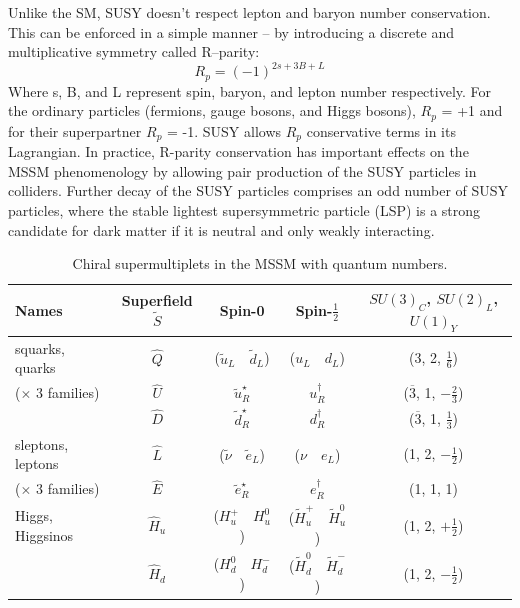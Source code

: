 Unlike the SM, SUSY doesn’t respect lepton and baryon number conservation. This can be enforced in a simple manner – by introducing a discrete and multiplicative symmetry called R–parity: 
\begin{equation}\label{equ:rparity}
R_{p} = (-1)^{2s+3B+L}
\end{equation}
Where s, B, and L represent spin, baryon, and lepton number respectively. For the ordinary particles (fermions, gauge bosons, and Higgs bosons), $R_{p}$ = +1 and for their superpartner $R_{p}$ = -1. SUSY allows $R_{p}$ conservative terms in its Lagrangian. In practice, R-parity conservation has important effects on the MSSM phenomenology by allowing pair production of the SUSY particles in colliders. Further decay of the SUSY particles comprises an odd number of SUSY particles, where the stable lightest supersymmetric particle (LSP) is a strong candidate for dark matter if it is neutral and only weakly interacting.    
\begin{table}[h]%
\centering
    \tabulinesep=1.0mm
     \begin{tabu}{|l|c|c|c|c|}
        \hline
        Names & Superfield $\widetilde{S}$ & Spin-0 & Spin-$\frac{1}{2}$ & $SU(3)_{C}$, $SU(2)_{L}$, $U(1)_{Y}$ \\
\hline 
squarks, quarks & $\hat{Q}$ & ($\widetilde{u}_{L} \quad \widetilde{d}_{L}$) & ($u_{L} \quad d_{L}$) & (3, 2, $\frac{1}{6}$) \\ 
 
($\times$ 3 families) & $\hat{U}$ & $\widetilde{u}_{R}^{\star}$ & ${u}^{\dagger}_{R}$ & ($\overline{3}$, 1, $-\frac{2}{3}$) \\

                      & $\hat{D}$ & $\widetilde{d}_{R}^{\star}$ & ${d}^{\dagger}_{R}$ & ($\overline{3}$, 1, $\frac{1}{3}$) \\
\hline
sleptons, leptons & $\hat{L}$ & ($\widetilde{\nu} \quad \widetilde{e}_{L}$) & ($\nu \quad e_{L}$) & (1, 2, $-\frac{1}{2}$) \\ 

($\times$ 3 families) & $\hat{E}$ & $\widetilde{e}_{R}^{\star}$ & ${e}^{\dagger}_{R}$ & (1, 1, 1) \\
\hline
Higgs, Higgsinos & $\hat{H}_{u}$ & ($H^{+}_{u} \quad H^{0}_{u}$) & ($\widetilde{H}^{+}_{u} \quad \widetilde{H}^{0}_{u}$) & (1, 2, $+\frac{1}{2}$) \\
                 & $\hat{H}_{d}$ & ($H^{0}_{d} \quad H^{-}_{d}$) & ($\widetilde{H}^{0}_{d} \quad \widetilde{H}^{-}_{d}$) & (1, 2, $-\frac{1}{2}$) \\
\hline
\end{tabu}
     \caption{Chiral supermultiplets in the MSSM with quantum numbers.\label{table:mssmparticles}}
\end{table}  
